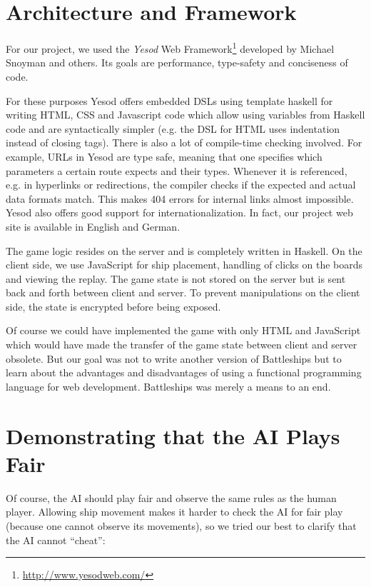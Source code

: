 \documentclass[a4paper]{easychair}
\begin{document}
\section{Architecture and Framework}

For our project, we used the \emph{Yesod} Web Framework\footnote{\url{http://www.yesodweb.com/}} developed by Michael Snoyman and others. Its goals are performance, type-safety and conciseness of code.

For these purposes Yesod offers embedded DSLs using template haskell for writing HTML, CSS and Javascript code which allow using variables from Haskell code and are syntactically simpler (e.g. the DSL for HTML uses indentation instead of closing tags). There is also a lot of compile-time checking involved. For example, URLs in Yesod are type safe, meaning that one specifies which parameters a certain route expects and their types. Whenever it is referenced, e.g. in hyperlinks or redirections, the compiler checks if the expected and actual data formats match. This makes 404 errors for internal links almost impossible. Yesod also offers good support for internationalization. In fact, our project web site is available in English and German.

The game logic resides on the server and is completely written in Haskell. On the client side, we use JavaScript for ship placement, handling of clicks on the boards and viewing the replay. The game state is not stored on the server but is sent back and forth between client and server. To prevent manipulations on the client side, the state is encrypted before being exposed.

Of course we could have implemented the game with only HTML and JavaScript which would have made the transfer of the game state between client and server obsolete. But our goal was not to write another version of Battleships but to learn about the advantages and disadvantages of using a functional programming language for web development. Battleships was merely a means to an end.


\section{Demonstrating that the AI Plays Fair}
\label{sect:fair-play}
Of course, the AI should play fair and observe the same rules as the human player. Allowing ship movement makes it harder to check the AI for fair play (because one cannot observe its movements), so we tried our best to clarify that the AI cannot ``cheat'':
\end{document}
